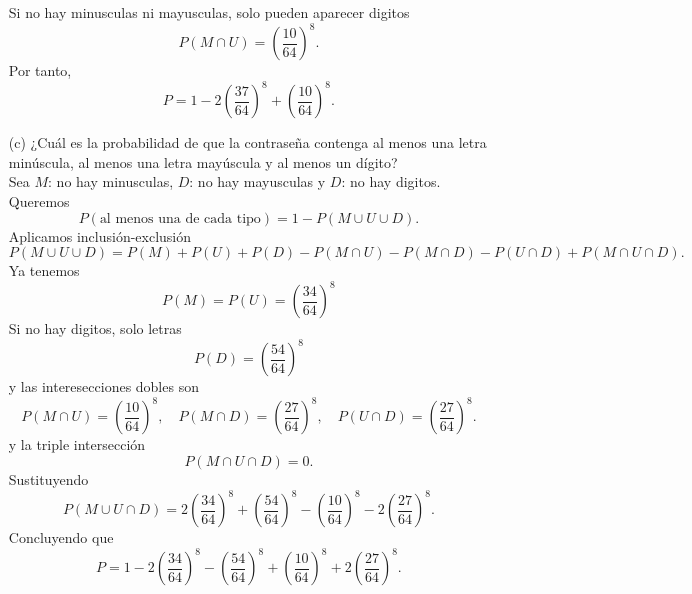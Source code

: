 \documentclass[12pt,a4paper]{article}
\begin{document}
\begin{solucion}
\begin{enumerate}
            Si no hay minusculas ni mayusculas, solo pueden aparecer digitos
            \begin{equation*}
                P(M\cap U)=\left(\frac{10}{64}\right)^{8}.
            \end{equation*}
            Por tanto,
            \begin{equation*}
                P=1-2\left(\frac{37}{64}\right)^{8}+\left(\frac{10}{64}\right)^{8}.
            \end{equation*}
            \item[(c)] ¿Cuál es la probabilidad de que la contraseña contenga al menos una letra minúscula, al menos una letra mayúscula y al menos un dígito?\\
            Sea $M$: no hay minusculas, $D$: no hay mayusculas y $D$: no hay digitos. Queremos
            \begin{equation*}
                P(\text{al menos una de cada tipo})=1-P(M\cup U\cup D).
            \end{equation*}
            Aplicamos inclusión-exclusión
            \begin{equation*}
                P(M\cup U\cup D)=P(M)+P(U)+P(D)-P(M\cap U)-P(M\cap D)-P(U\cap D)+P(M\cap U\cap D).
            \end{equation*}
            Ya tenemos
            \begin{equation*}
                P(M)=P(U)=\left(\frac{34}{64}\right)^{8}
            \end{equation*}
            Si no hay digitos, solo letras
            \begin{equation*}
                P(D)=\left(\frac{54}{64}\right)^{8}
            \end{equation*}
            y las interesecciones dobles son
            \begin{equation*}
                P(M\cap U)=\left(\frac{10}{64}\right)^{8},\quad P(M\cap D)=\left(\frac{27}{64}\right)^{8},\quad P(U\cap D)=\left(\frac{27}{64}\right)^{8}.
            \end{equation*}
            y la triple intersección
            \begin{equation*}
                P(M\cap U\cap D)=0.
            \end{equation*}
            Sustituyendo
            \begin{equation*}
                P(M\cup U\cap D)=2\left(\frac{34}{64}\right)^{8}+\left(\frac{54}{64}\right)^{8}-\left(\frac{10}{64}\right)^{8}-2\left(\frac{27}{64}\right)^{8}.
            \end{equation*}
            Concluyendo que
            \begin{equation*}
                P=1-2\left(\frac{34}{64}\right)^{8}-\left(\frac{54}{64}\right)^{8}+\left(\frac{10}{64}\right)^{8}+2\left(\frac{27}{64}\right)^{8}.
            \end{equation*}
        \end{enumerate}
    \end{solucion}
\end{document}
